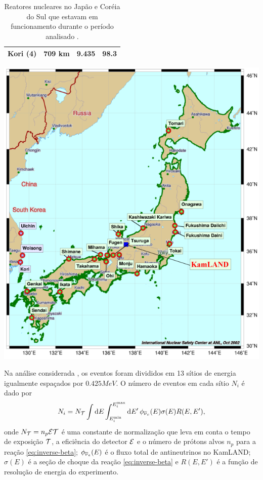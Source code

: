 \documentclass[12pt]{report}
\begin{document}
\begin{table}[ht]
\begin{minipage}[b]{0.49\linewidth}
{\begin{tabular}{ | c | c | c | c |}
Kori (4)               & 709 km    & 9.435  &  98.3             \\ \hline
\end{tabular}
}
\caption{Reatores nucleares no Japão e Coréia do Sul que estavam em funcionamento durante o período analisado \cite{pris-iaea}.}
\label{table:reactors}
\end{minipage}\hfill
\begin{minipage}[b]{0.47\linewidth}
    \centering
    \includegraphics[width=\textwidth]{fig/kamland-map.png}
    \label{fig:kamland-map}
    \end{minipage}
\end{table}

Na análise considerada \cite{spectral-distortion}, os eventos foram divididos em 13 sítios de energia igualmente espaçados por $0.425 \unit{MeV}$. O número de eventos em cada sítio $N_i$ é dado por \cite{juno}
\begin{equation} \label{eq:n_events}
N_i = N_{\mathcal{T}} \int \dd{E}
\int_{E_i^{\text{min}}}^{E_i^{\text{max}}} \dd{E'}
\phi_{\overline{\nu}_e}(E) \sigma(E) R(E, E'),
\end{equation}
onde $N_{\mathcal{T}} = n_p \mathcal{E} \mathcal{T}$ é uma constante de normalização que leva em conta o tempo de exposição $\mathcal{T}$, a eficiência do detector $\mathcal{E}$ e o número de prótons alvos $n_p$ para a reação \ref{eq:inverse-beta}; $\phi_{\overline{\nu}_e}(E)$ é o fluxo total de antineutrinos no KamLAND; $\sigma(E)$ é a seção de choque da reação \ref{eq:inverse-beta} e $R(E, E')$ é a função de resolução de energia do experimento.
\end{document}
